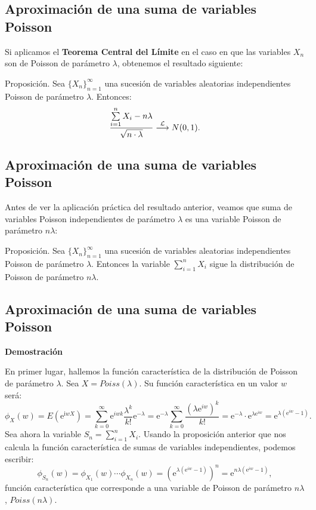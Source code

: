 \documentclass[]{book}
\begin{document}
\hypertarget{aproximaciuxf3n-de-una-suma-de-variables-poisson}{%
\subsection{Aproximación de una suma de variables Poisson}\label{aproximaciuxf3n-de-una-suma-de-variables-poisson}}

Si aplicamos el \textbf{Teorema Central del Límite} en el caso en que las variables \(X_n\) son de Poisson de parámetro \(\lambda\), obtenemos el resultado siguiente:

 Proposición.
Sea \(\{X_n\}_{n=1}^\infty\) una sucesión de variables aleatorias independientes Poisson de parámetro \(\lambda\). Entonces:
\[
\frac{\sum\limits_{i=1}^n X_i -n\lambda}{\sqrt{n\cdot \lambda}}\stackrel{{\cal L}}{\longrightarrow} N(0,1).
\]

\hypertarget{aproximaciuxf3n-de-una-suma-de-variables-poisson-1}{%
\subsection{Aproximación de una suma de variables Poisson}\label{aproximaciuxf3n-de-una-suma-de-variables-poisson-1}}

Antes de ver la aplicación práctica del resultado anterior, veamos que suma de variables Poisson independientes de parámetro \(\lambda\) es una variable Poisson de parámetro \(n\lambda\):

 Proposición.
Sea \(\{X_n\}_{n=1}^\infty\) una sucesión de variables aleatorias independientes Poisson de parámetro \(\lambda\). Entonces la variable \(\sum\limits_{i=1}^n X_i\) sigue la distribución de Poisson de parámetro \(n\lambda\).

\hypertarget{aproximaciuxf3n-de-una-suma-de-variables-poisson-2}{%
\subsection{Aproximación de una suma de variables Poisson}\label{aproximaciuxf3n-de-una-suma-de-variables-poisson-2}}

\textbf{Demostración}

En primer lugar, hallemos la función característica de la distribución de Poisson de parámetro \(\lambda\). Sea \(X=Poiss(\lambda)\). Su función característica en un valor \(w\) será:
\[
\phi_X(w)=E\left(\mathrm{e}^{\mathrm{i} w X}\right)=\sum_{k=0}^\infty \mathrm{e}^{i w k}\frac{\lambda^k}{k!}\mathrm{e}^{-\lambda}=\mathrm{e}^{-\lambda} \sum_{k=0}^\infty \frac{\left(\lambda\mathrm{e}^{iw}\right)^k}{k!}=\mathrm{e}^{-\lambda}\cdot \mathrm{e}^{\lambda\mathrm{e}^{iw}}=\mathrm{e}^{\lambda \left(\mathrm{e}^{iw}-1\right)}.
\]
Sea ahora la variable \(S_n=\sum\limits_{i=1}^n X_i\). Usando la proposición anterior que nos calcula la función característica de sumas de variables independientes, podemos escribir:
\[
\phi_{S_n}(w)=\phi_{X_1}(w)\cdots \phi_{X_n}(w)=\left(\mathrm{e}^{\lambda \left(\mathrm{e}^{iw}-1\right)}\right)^n =\mathrm{e}^{n\lambda \left(\mathrm{e}^{iw}-1\right)},
\]
función característica que corresponde a una variable de Poisson de parámetro \(n\lambda\), \(Poiss(n\lambda)\).
\end{document}
